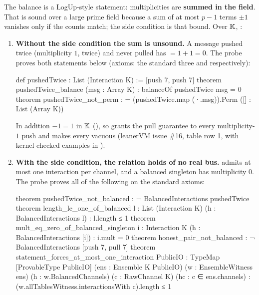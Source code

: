 The balance is a LogUp-style statement: multiplicities are \textbf{summed in the field}. That is
sound over a large prime field because a sum of at most $p - 1$ terms $\pm 1$ vanishes only if
the counts match; the side condition  is that bound. Over $\mathbb{K}$,
:
\begin{enumerate}
\item \textbf{Without the side condition the sum is unsound.} A message pushed twice
  (multiplicity $1$, twice) and never pulled has  $= 1 + 1 = 0$. The probe
   proves both statements below (axioms: the standard three and
  \lean{[propext]} respectively):

\begin{leancode}
def pushedTwice : List (Interaction K) := [push 7, push 7]
theorem pushedTwice_balance (msg : Array K) : balanceOf pushedTwice msg = 0
theorem pushedTwice_not_perm :
    ¬ (pushedTwice.map (·.msg)).Perm ([] : List (Array K))
\end{leancode}

  In addition $-1 = 1$ in $\mathbb{K}$ (), so
   grants the pull guarantee to every multiplicity-$1$ push and makes every
   vacuous (leanerVM issue \#16, table row 1, with kernel-checked examples in
  \allowbreak{}\allowbreak{}\allowbreak{}).
\item \textbf{With the side condition, the relation holds of no real bus.} 
  admits at most one interaction per channel, and a balanced singleton has multiplicity $0$. The
  probe  proves all of the following on the standard axioms:

\begin{leancode}
theorem pushedTwice_not_balanced : ¬ BalancedInteractions pushedTwice
theorem length_le_one_of_balanced {l : List (Interaction K)} (h : BalancedInteractions l) :
    l.length ≤ 1
theorem mult_eq_zero_of_balanced_singleton {i : Interaction K}
    (h : BalancedInteractions [i]) : i.mult = 0
theorem honest_pair_not_balanced : ¬ BalancedInteractions [push 7, pull 7]
theorem statement_forces_at_most_one_interaction {PublicIO : TypeMap} [ProvableType PublicIO]
    (ens : Ensemble K PublicIO) (w : EnsembleWitness ens) (h : w.BalancedChannels)
    (c : RawChannel K) (hc : c ∈ ens.channels) :
    (w.allTablesWitness.interactionsWith c).length ≤ 1
\end{leancode}


\end{enumerate}
